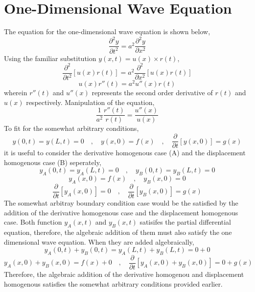 \chapter{One-Dimensional Wave Equation}
\begin{comment} 
Physics Archives
\end{comment}
The equation for the one-dimensional wave equation is shown below,
$$\frac{\partial^2 y}{\partial t^2} = a^2\frac{\partial^2 y}{\partial x^2}$$ 
Using the familiar substitution $\displaystyle{y(x,t) = u(x)\times r(t)}$,
$$\frac{\partial^2}{\partial t^2}\left[u(x)r(t)\right] = a^2\frac{\partial^2}{\partial x^2}\left[u(x)r(t)\right]$$
$$u(x)r''(t) = a^2u''(x)r(t)$$ 
wherein $r''(t)$ and $u''(x)$ represents the second order derivative of $r(t)$ and $u(x)$ respectively. Manipulation of the equation,
$$\frac{1}{a^2}\frac{r''(t)}{r(t)} = \frac{u''(x)}{u(x)}$$
To fit for the somewhat arbitrary conditions,
$$y(0,t) = y(L,t) = 0\quad,\quad y(x,0) = f(x) \quad,\quad \frac{\partial}{\partial t}\left[y(x,0)\right] = g(x)$$
it is useful to consider the derivative homogenous case (A) and the displacement homogenous case (B) seperately,
$$y_A(0,t) = y_A(L,t) = 0\quad,\quad y_B(0,t) = y_B(L,t) = 0$$
$$y_A(x,0) = f(x)\quad,\quad y_B(x,0) = 0$$
$$\frac{\partial }{\partial t}[y_A(x,0)] = 0\quad,\quad \frac{\partial }{\partial t}[y_B(x,0)] = g(x)$$
The somewhat arbitray boundary condition case would be the satisfied by the  addition of the derivative homogenous case  and the displacement homogenous case. Both function $y_A(x,t)$ and $y_B(x,t)$ satisifes the partial differential equation, therefore, the algebraic addition of them must also satisfy the one dimensional wave equation. When they are added algebraically,
$$y_A(0,t) + y_B(0,t) = y_A(L,t) + y_B(L,t) = 0 + 0$$
$$y_A(x,0) + y_B(x,0) = f(x) + 0\quad,\quad \frac{\partial}{\partial t}\left[y_A(x,0) + y_B(x,0)\right] = 0 + g(x)$$
Therefore, the algebraic addition of the derivative homogenou and displacement homogenous satisfies the somewhat arbitrary conditions provided earlier.
